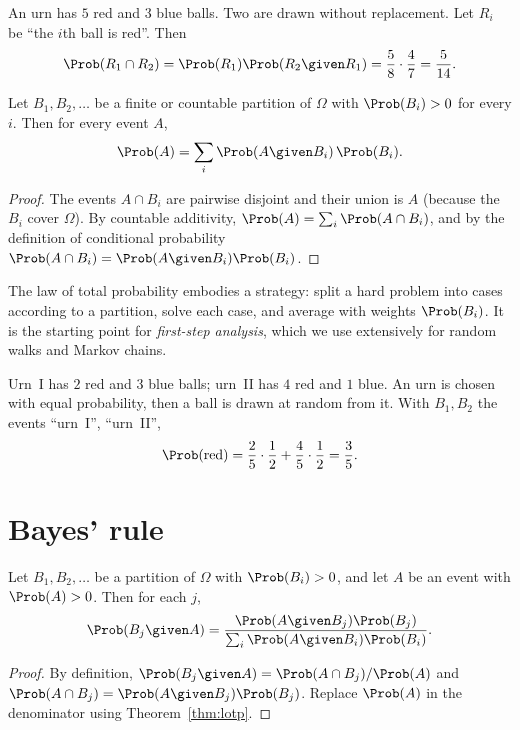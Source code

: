 \begin{example}
An urn has $5$ red and $3$ blue balls. Two are drawn without replacement. Let
$R_i$ be ``the $i$th ball is red''. Then
\[
\Prob(R_1\cap R_2)=\Prob(R_1)\Prob(R_2\given R_1)=\frac58\cdot\frac47=\frac5{14}.
\]
\end{example}

\begin{theorem}\label{thm:lotp}
Let $B_1,B_2,\dots$ be a finite or countable partition of $\Omega$ with
$\Prob(B_i)>0$ for every $i$. Then for every event $A$,
\[
\Prob(A)=\sum_i\Prob(A\given B_i)\,\Prob(B_i).
\]
\end{theorem}
\begin{proof}
The events $A\cap B_i$ are pairwise disjoint and their union is $A$ (because the
$B_i$ cover $\Omega$). By countable additivity,
$\Prob(A)=\sum_i\Prob(A\cap B_i)$, and by the definition of conditional
probability $\Prob(A\cap B_i)=\Prob(A\given B_i)\Prob(B_i)$.
\end{proof}

The law of total probability embodies a strategy: split a hard problem into
cases according to a partition, solve each case, and average with weights
$\Prob(B_i)$. It is the starting point for \emph{first-step analysis}, which we
use extensively for random walks and Markov chains.

\begin{example}
Urn~I has $2$ red and $3$ blue balls; urn~II has $4$ red and $1$ blue. An urn is
chosen with equal probability, then a ball is drawn at random from it. With
$B_1,B_2$ the events ``urn~I'', ``urn~II'',
\[
\Prob(\text{red})=\frac25\cdot\frac12+\frac45\cdot\frac12=\frac35 .
\]
\end{example}

\section{Bayes' rule}\label{sec:bayes}

\begin{theorem}\label{thm:bayes}
Let $B_1,B_2,\dots$ be a partition of $\Omega$ with $\Prob(B_i)>0$, and let $A$
be an event with $\Prob(A)>0$. Then for each $j$,
\[
\Prob(B_j\given A)=\frac{\Prob(A\given B_j)\Prob(B_j)}{\sum_i\Prob(A\given B_i)\Prob(B_i)} .
\]
\end{theorem}
\begin{proof}
By definition, $\Prob(B_j\given A)=\Prob(A\cap B_j)/\Prob(A)$ and
$\Prob(A\cap B_j)=\Prob(A\given B_j)\Prob(B_j)$. Replace $\Prob(A)$ in the
denominator using Theorem~\ref{thm:lotp}.
\end{proof}

